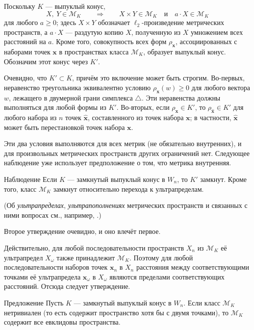 Поскольку $K$ --- выпуклый конус,
\[X,\ Y\in  \mathcal{M}_K
\qquad\Longrightarrow\qquad
X\times Y\in\mathcal{M}_K
\quad\text{и}\quad
a\cdot X\in\mathcal{M}_K
\]
для любого $a\geqslant 0$;
здесь $X\times Y$ обозначает $\ell_2$-произведение метрических пространств, а
$a\cdot X$ --- раздутую копию $X$, полученную из $X$ умножением всех расстояний на $a$.
Кроме того, совокупность всех форм $\rho_{\bm{x}}$, ассоциированных с наборами точек $\bm{x}$ в пространствах класса $\mathcal{M}_K$, образует выпуклый конус.
Обозначим этот конус через $K'$.

Очевидно, что $K'\subset K$, причём это включение может быть строгим.
Во-первых, неравенство треугольника эквивалентно условию $\rho_{\bm{x}}(w)\geqslant 0$ для любого вектора $w$, лежащего в двумерной грани симплекса $\triangle$.
Эти неравенства должны выполняться для любой формы из $K'$.
Во-вторых, если $\rho_{\bm{x}}\in K'$, то $\rho_{\hat{\bm{x}}}\in K'$ для любого набора из $n$ точек $\hat{\bm{x}}$, составленного из точек набора $\bm{x}$;
в частности, $\hat{\bm{x}}$ может быть перестановкой точек набора $\bm{x}$.

Эти два условия выполняются для всех метрик (не обязательно внутренних),
и для произвольных метрических пространств других ограничений нет.
Следующее наблюдение уже использует предположение о том, что метрика внутренняя.

\begin{thm}{Наблюдение}
Если $K$ --- замкнутый выпуклый конус в $W_n$, то $K'$ замкнут.
Кроме того, класс $\mathcal{M}_K$ замкнут относительно перехода к ультрапределам.
\end{thm}

(Об \emph{ультрапределах}, \emph{ультрапополнениях} метрических пространств и связанных с ними вопросах см., например, \cite{petrunin2023}.)

Второе утверждение очевидно, и оно влечёт первое.

Действительно, для любой последовательности пространств $X_n$ из $\mathcal{M}_K$ её ультрапредел $X_\omega$ также принадлежит $\mathcal{M}_K$.
Поэтому для любой последовательности наборов точек $\bm{x}_n$ в $X_n$
расстояния между соответствующими точками её ультрапредела $\bm{x}_\omega$ в $X_\omega$ являются пределами соответствующих расстояний.
Отсюда следует утверждение.
\qeds

\begin{thm}{Предложение}\label{prop:Associated form}
Пусть $K$ --- замкнутый выпуклый конус в $W_n$.
Если класс $\mathcal{M}_K$ нетривиален (то есть содержит пространство хотя бы с двумя точками), то $\mathcal{M}_K$ содержит все евклидовы пространства.
\end{thm}

